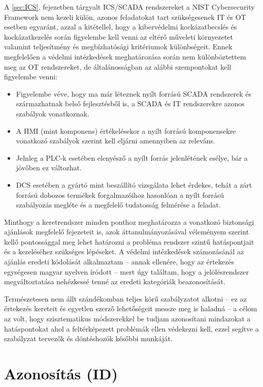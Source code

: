 \documentclass[12pt,magyar,a4paper,oneside]{scrreprt}
\providecommand{\tightlist}{%
  \setlength{\itemsep}{0pt}\setlength{\parskip}{0pt}}
\begin{document}
A \ref{sec:ICS}. fejezetben tárgyalt ICS/SCADA rendszereket a NIST
Cybersecurity Framework nem kezeli külön, azonos feladatokat tart
szükségesenek IT és OT esetben egyaránt, azzal a kitétellel, hogy a
kibervédelmi kockázatbecslés és kockázatkezelés során figyelembe kell
venni az eltérő műveleti környezetet valamint teljesítmény és
megbízhatósági kritériumok különbségeit. Ennek megfelelően a védelmi
intézkedések meghatározása során nem különböztettem meg az OT
rendszereket, de általánosságban az alábbi szempontokat kell figyelembe
venni:

\begin{itemize}
\tightlist
\item
  Figyelembe véve, hogy ma már léteznek nyílt forrású SCADA rendszerek
  és származhatnak belső fejlesztésből is, a SCADA és IT rendszerekre
  azonos szabályok vonatkoznak.
\item
  A HMI (mint komponens) értékelésekor a nyílt forrású komponensekre
  vonatkozó szabályok szerint kell eljárni amennyiben az releváns.
\item
  Jelnleg a PLC-k esetében elenyésző a nyílt forrás jelenlétének esélye,
  bár a jövőben ez változhat.
\item
  DCS esetében a gyártó mint beszállító vizsgálata lehet érdekes, tehát
  a zárt forrású dobozos termékek forgalmazóihoz hasonlóan a nyílt
  forrású szabályozás megléte és a megfelelő tudatosság felmérése a
  feladat.
\end{itemize}

Minthogy a keretrendszer minden ponthoz meghatározza a vonatkozó
biztonsági ajánlások megfelelő fejezeteit is, azok áttanulmányozásával
véleményem szerint kellő pontossággal meg lehet határozni a probléma
rendszer szintű hatáspontjait és a kezeléséhez szükséges lépéseket. A
védelmi intézkedések számozásánál az ajánlás eredeti kódolását
alkalmaztam -- annak ellenére, hogy az értekezés egységesen magyar
nyelven íródott -- mert úgy találtam, hogy a jelölésrendszer
megváltoztatása nehézkessé tenné az eredeti kategóriák beazonosítását.

Természetesen nem állt szándékomban teljes körű szabályzatot alkotni --
ez az értekezés kereteit és egyetlen szerző lehetőségeit messze meg is
haladná -- a célom az volt, hogy szisztematikus módszerekkel be tudjam
azonosítani mindazokat a hatáspontokat ahol a feltérképezett problémák
ellen védekezni kell, ezzel segítve a szabályzat tervezők és döntéshozók
későbbi munkáját.

\hypertarget{azonosuxedtuxe1s-id}{%
\section{Azonosítás (ID)}\label{azonosuxedtuxe1s-id}}
\end{document}
